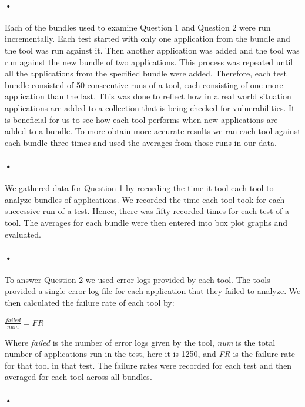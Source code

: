 \documentclass[twocolumn]{article}
\begin{document}
\paragraph{•}
	Each of the bundles used to examine Question 1 and Question 2 were run incrementally. Each test started with only one application from the bundle and the tool was run against it. Then another application was added and the tool was run against the new bundle of two applications. This process was repeated until all the applications from the specified bundle were added. Therefore, each test bundle consisted of 50 consecutive runs of a tool, each consisting of one more application than the last. This was done to reflect how in a real world situation applications are added to a collection that is being checked for vulnerabilities. It is beneficial for us to see how each tool performs when new applications are added to a bundle. To more obtain more accurate results we ran each tool against each bundle three times and used the averages from those runs in our data.
\paragraph{•}
	We gathered data for Question 1 by recording the time it tool each tool to analyze bundles of applications. We recorded the time each tool took for each successive run of a test. Hence, there was fifty recorded times for each test of a tool. The averages for each bundle were then entered into box plot graphs and evaluated.
\paragraph{•}
	To answer Question 2 we used error logs provided by each tool. The tools provided a single error log file for each application that they failed to analyze. We then calculated the failure rate of each tool by:\\
	\begin{center}
		\(\frac{failed}{num}=FR\)
	\end{center}
	Where \textit{failed} is the number of error logs given by the tool, \textit{num} is the total number of applications run in the test, here it is 1250, and \textit{FR} is the failure rate for that tool in that test. The failure rates were recorded for each test and then averaged for each tool across all bundles.
\paragraph{•}
	
\end{document}
